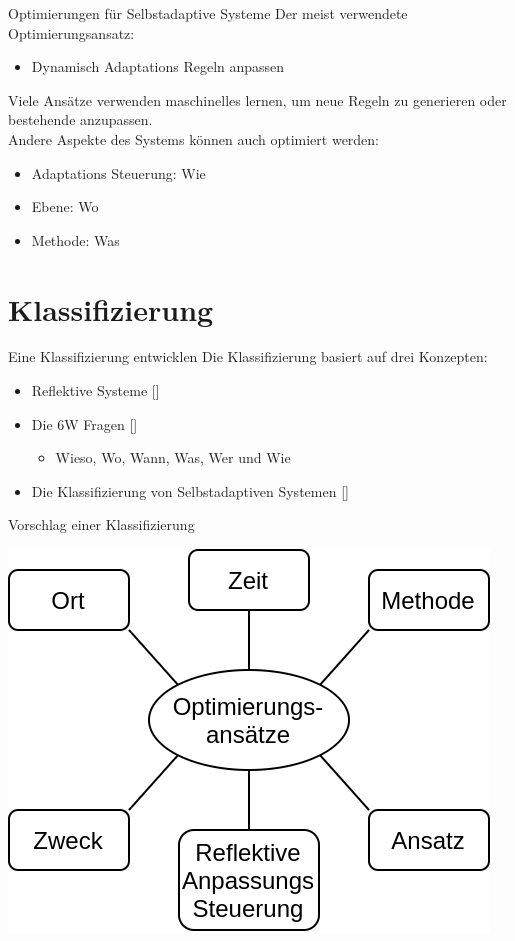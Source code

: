 \documentclass[de,16:9]{sdqbeamer}
\begin{document}
\begin{frame}{Optimierungen für Selbstadaptive Systeme}
	Der meist verwendete Optimierungsansatz:
	\begin{itemize}
		\item Dynamisch Adaptations Regeln anpassen
	\end{itemize}
	\medskip
	Viele Ansätze verwenden maschinelles lernen, um neue Regeln zu generieren
	oder bestehende anzupassen. \\
	\medskip
	Andere Aspekte des Systems können auch optimiert werden:
	\begin{itemize}
		\item Adaptations Steuerung: Wie
		\item Ebene: Wo
		\item Methode: Was
	\end{itemize}
\end{frame}

\section{Klassifizierung}

\begin{frame}{Eine Klassifizierung entwicklen}
	Die Klassifizierung basiert auf drei Konzepten:
	\begin{itemize}
		\item Reflektive Systeme [\cite{FORMS}]
		\item Die 6W Fragen [\cite{LandscapeAndResearchChallenges}]
		\begin{itemize}
			\item Wieso, Wo, Wann, Was, Wer und Wie
		\end{itemize}
		\item Die Klassifizierung von Selbstadaptiven Systemen [\cite{SurveyOnEngineeringApproaches}]
	\end{itemize}
\end{frame}

\begin{frame}{Vorschlag einer Klassifizierung}
	\begin{center}
		\includegraphics[width=.45\textwidth]{sources/ClassificationProposal-Proposal_DE.png}
	\end{center}
\end{frame}
\end{document}
